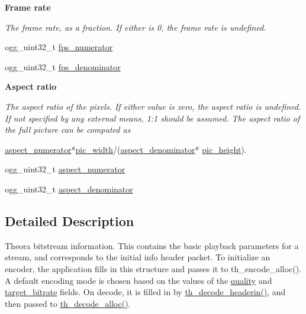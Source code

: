 \begin{Indent}\textbf{ Frame rate}\par
{\em The frame rate, as a fraction. If either is 0, the frame rate is undefined. }\begin{DoxyCompactItemize}
\item 
ogg\+\_\+uint32\+\_\+t \hyperlink{structth__info_a20606e61676f585a7e59cfc96de190a5}{fps\+\_\+numerator}
\item 
ogg\+\_\+uint32\+\_\+t \hyperlink{structth__info_aa619408f70c03935529f1d3eda7a3ec2}{fps\+\_\+denominator}
\end{DoxyCompactItemize}
\end{Indent}
\begin{Indent}\textbf{ Aspect ratio}\par
{\em The aspect ratio of the pixels. If either value is zero, the aspect ratio is undefined. If not specified by any external means, 1\+:1 should be assumed. The aspect ratio of the full picture can be computed as 
\begin{DoxyCode}
\hyperlink{structth__info_a5be65dac9f75e37864cf73dd543570cd}{aspect\_numerator}*\hyperlink{structth__info_a5048edf77b141dd3e9a92ca85e317345}{pic\_width}/(\hyperlink{structth__info_a04c0bd477222d747a76085d8720322e2}{aspect\_denominator}*
      \hyperlink{structth__info_a775178474283c5990ba73f9ba7f6b88b}{pic\_height}).
\end{DoxyCode}
 }\begin{DoxyCompactItemize}
\item 
ogg\+\_\+uint32\+\_\+t \hyperlink{structth__info_a5be65dac9f75e37864cf73dd543570cd}{aspect\+\_\+numerator}
\item 
ogg\+\_\+uint32\+\_\+t \hyperlink{structth__info_a04c0bd477222d747a76085d8720322e2}{aspect\+\_\+denominator}
\end{DoxyCompactItemize}
\end{Indent}


\subsection{Detailed Description}
Theora bitstream information. This contains the basic playback parameters for a stream, and corresponds to the initial \textquotesingle{}info\textquotesingle{} header packet. To initialize an encoder, the application fills in this structure and passes it to th\+\_\+encode\+\_\+alloc(). A default encoding mode is chosen based on the values of the \hyperlink{structth__info_aa4cdcf96cb46b256821993e9a830ee02}{quality} and \hyperlink{structth__info_a1d9c8d768a4ae623269f5bd8f6f7a015}{target\+\_\+bitrate} fields. On decode, it is filled in by \hyperlink{group__decfuncs_ga006d01d36fbe64768c571e6a12b7fc50}{th\+\_\+decode\+\_\+headerin()}, and then passed to \hyperlink{group__decfuncs_ga0ef07a9a97849054aa606c595a2d807e}{th\+\_\+decode\+\_\+alloc()}.

